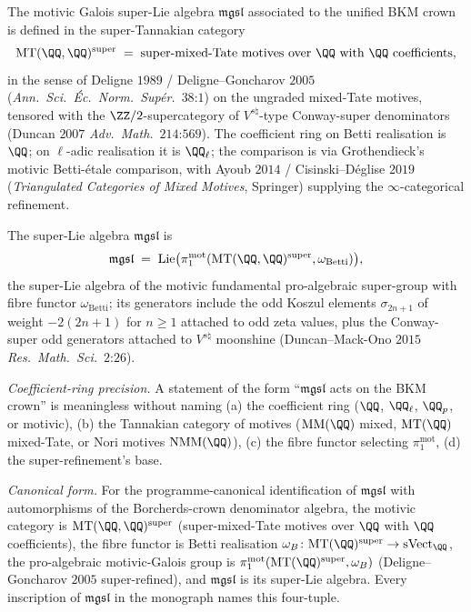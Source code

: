 \begin{theorem}
\label{wn:thm:third-pass-MGSL}

The motivic Galois super-Lie algebra $\mathfrak{mgsl}$ associated to
the unified BKM crown is defined in the super-Tannakian category
\[
\mathrm{MT}(\QQ, \QQ)^{\mathrm{super}}
\;=\; \text{super-mixed-Tate motives over }\QQ\text{ with }\QQ\text{
coefficients},
\]
in the sense of Deligne $1989$ / Deligne--Goncharov $2005$
(\emph{Ann.~Sci.~\'Ec.~Norm.~Sup\'er.}~$38$:$1$) on the ungraded
mixed-Tate motives, tensored with the $\ZZ/2$-supercategory of
$V^{s\natural}$-type Conway-super denominators (Duncan $2007$
\emph{Adv.~Math.}~$214$:$569$). The coefficient ring on Betti
realisation is $\QQ$; on $\ell$-adic realisation it is $\QQ_\ell$; the
comparison is via Grothendieck's motivic Betti-\'etale comparison,
with Ayoub $2014$ / Cisinski--D\'eglise $2019$
(\emph{Triangulated Categories of Mixed Motives}, Springer) supplying
the $\infty$-categorical refinement.

The super-Lie algebra $\mathfrak{mgsl}$ is
\[
\mathfrak{mgsl} \;=\; \mathrm{Lie}\bigl(\pi_1^{\mathrm{mot}}(\mathrm{MT}
(\QQ, \QQ)^{\mathrm{super}}, \omega_{\mathrm{Betti}})\bigr),
\]
the super-Lie algebra of the motivic fundamental pro-algebraic
super-group with fibre functor $\omega_{\mathrm{Betti}}$; its
generators include the odd Koszul elements $\sigma_{2n+1}$ of weight
$-2(2n+1)$ for $n \geq 1$ attached to odd zeta values, plus the
Conway-super odd generators attached to $V^{s\natural}$ moonshine
(Duncan--Mack-Ono $2015$ \emph{Res.~Math.~Sci.}~$2$:$26$).

\emph{Coefficient-ring precision.} A statement of the form ``$\mathfrak{mgsl}$
acts on the BKM crown'' is meaningless without naming (a) the
coefficient ring ($\QQ$, $\QQ_\ell$, $\QQ_p$, or motivic), (b) the
Tannakian category of motives ($\mathrm{MM}(\QQ)$ mixed,
$\mathrm{MT}(\QQ)$ mixed-Tate, or Nori motives $\mathrm{NMM}(\QQ)$),
(c) the fibre functor selecting $\pi_1^{\mathrm{mot}}$, (d) the
super-refinement's base.

\emph{Canonical form.} For the programme-canonical identification of
$\mathfrak{mgsl}$ with automorphisms of the Borcherds-crown
denominator algebra, the motivic category is
$\mathrm{MT}(\QQ, \QQ)^{\mathrm{super}}$ (super-mixed-Tate motives
over $\QQ$ with $\QQ$ coefficients), the fibre functor is Betti
realisation $\omega_B\colon \mathrm{MT}(\QQ)^{\mathrm{super}}
\to \mathrm{sVect}_{\QQ}$, the pro-algebraic motivic-Galois group is
$\pi_1^{\mathrm{mot}}(\mathrm{MT}(\QQ)^{\mathrm{super}}, \omega_B)$
(Deligne--Goncharov $2005$ super-refined), and $\mathfrak{mgsl}$ is
its super-Lie algebra. Every inscription of $\mathfrak{mgsl}$ in the
monograph names this four-tuple.


\end{theorem}
